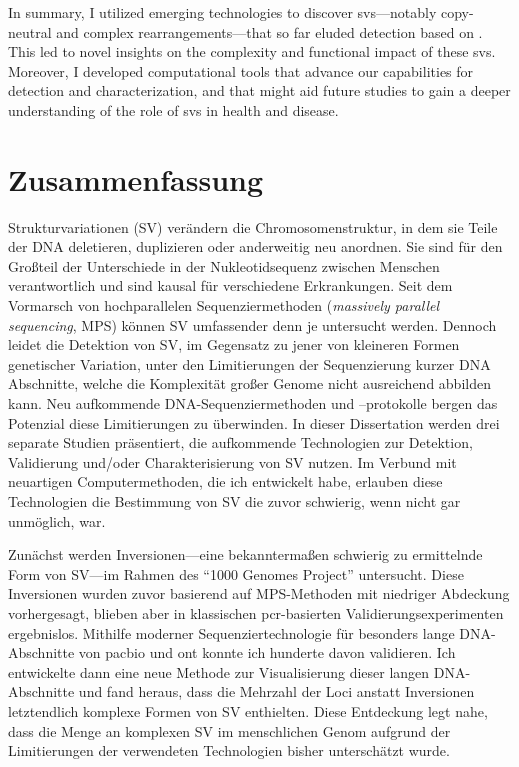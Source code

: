 In summary, I utilized emerging technologies to discover \acp{sv}---notably
copy-neutral and complex rearrangements---that so far eluded detection based on
\mps. This led to novel insights on the complexity and functional impact of these
\acp{sv}. Moreover, I developed computational tools that advance our capabilities
for \sv detection and characterization, and that might aid future studies to gain a
deeper understanding of the role of \acp{sv} in health and disease.




\cleardoublepage
{}
\chapter*{Zusammenfassung}%
%

Strukturvariationen (SV) verändern die Chromosomenstruktur, in dem sie
Teile der DNA deletieren, duplizieren oder anderweitig neu anordnen. Sie sind für
den Großteil der Unterschiede in der Nukleotidsequenz zwischen Menschen verantwortlich
und sind kausal für verschiedene Er\-kran\-kun\-gen. Seit dem Vormarsch
von hochparallelen Sequenziermethoden (\textit{massively parallel sequencing},
MPS) können SV umfassender denn je untersucht werden. Dennoch leidet die Detektion von
SV, im Gegensatz zu jener von kleineren Formen genetischer Variation, unter den
Limitierungen der Sequenzierung kurzer DNA Abschnitte, welche die Komplexität
großer Genome nicht ausreichend abbilden kann. Neu aufkommende
DNA-Se\-quen\-zier\-me\-tho\-den und –protokolle bergen das Potenzial diese Limitierungen
zu überwinden. In dieser Dissertation werden drei separate Studien präsentiert,
die aufkommende Technologien zur Detektion, Validierung und/oder Charakterisierung
von SV nutzen. Im Verbund mit neuartigen Computermethoden, die ich entwickelt habe,
erlauben diese Technologien die Bestimmung von SV die zuvor schwierig, wenn
nicht gar unmöglich, war.

Zunächst werden Inversionen---eine bekanntermaßen schwierig zu ermittelnde Form
von SV---im Rahmen des ``1000 Genomes Project'' untersucht. Diese Inversionen wurden zuvor
basierend auf MPS-Methoden mit niedriger Ab\-de\-ckung vorhergesagt, blieben aber
in klassischen \acs{pcr}-basierten Va\-li\-die\-rungs\-ex\-pe\-ri\-men\-ten ergebnislos.
Mithilfe moderner
Sequenziertechnologie für besonders lange DNA\--Ab\-schnit\-te von \acl{pacbio}
und \acl{ont} konnte ich hunderte davon validieren. Ich entwickelte dann eine
neue Methode zur Visualisierung dieser langen DNA-Abschnitte und fand heraus,
dass die Mehrzahl der Loci anstatt Inversionen letztendlich komplexe Formen von
SV enthielten. Diese Entdeckung legt nahe, dass die Menge an komplexen SV im
menschlichen Genom aufgrund der Limitierungen der verwendeten Technologien bisher
unterschätzt wurde.

